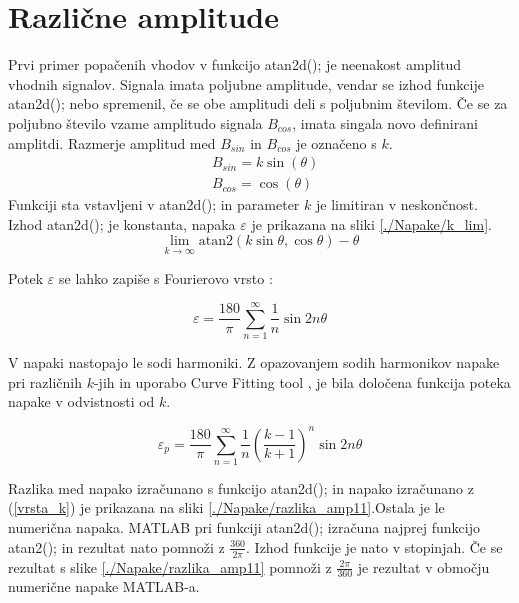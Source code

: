 \section{Različne amplitude}
Prvi primer popačenih vhodov v funkcijo atan2d(); je neenakost amplitud vhodnih signalov. Signala imata poljubne amplitude, vendar se izhod funkcije atan2d(); nebo spremenil, če se obe amplitudi deli s
poljubnim številom. Če se za poljubno število vzame amplitudo signala $B_{cos}$, imata singala novo definirani amplitdi. Razmerje amplitud med $B_{sin}$ in $B_{cos}$ je označeno s $k$.
\begin{eqnarray}
\label{equ:def_sin_ama}
&B_{sin} = k \sin(\theta)\\
\label{equ:def_cos_amp}
&B_{cos} =\cos(\theta)
\end{eqnarray}
Funkciji sta vstavljeni v atan2d(); in parameter $k$ je limitiran v neskončnost. Izhod atan2d(); je konstanta, napaka $\varepsilon$ je prikazana na sliki \ref{./Napake/k_lim}.
\begin{equation}
\lim_{k \rightarrow \infty} \mathrm{atan2}(k \sin{\theta},\cos{\theta}) - \theta
\end{equation}

Potek $\varepsilon$ se lahko zapiše s Fourierovo vrsto \cite{Matematika1}:

\begin{equation}
\varepsilon = \frac{180}{\pi}\sum_{n=1}^{\infty}\frac{1}{n} \sin 2 n \theta
\end{equation}

V napaki nastopajo le sodi harmoniki. Z opazovanjem sodih harmonikov napake pri različnih $k$-jih in uporabo Curve Fitting tool \cite{cftool}, je bila določena funkcija poteka napake v odvistnosti od $k$. 

\begin{equation}
\label{vrsta_k}
\varepsilon_p =\frac{180}{\pi}\sum_{n=1}^{\infty}\frac{1}{n}(\frac{k-1}{k+1})^n \sin 2 n \theta
\end{equation}


Razlika med napako izračunano s funkcijo atan2d(); in napako izračunano z (\ref{vrsta_k}) je prikazana na sliki \ref{./Napake/razlika_amp11}.Ostala je le numerična napaka. MATLAB pri funkciji atan2d(); izračuna najprej funkcijo
atan2(); in  rezultat nato pomnoži z $\frac{360}{2\pi}$. Izhod funkcije je nato v stopinjah. Če se rezultat s slike \ref{./Napake/razlika_amp11} pomnoži z $\frac{2\pi}{360}$ je rezultat v območju numerične napake MATLAB-a.
\newpage
